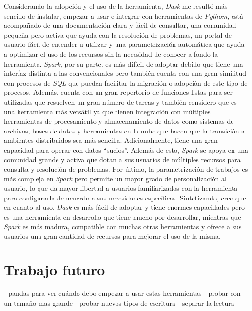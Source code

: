 Considerando la adopción y el uso de la herramienta, \textit{Dask} me resultó más sencillo de instalar, empezar a usar e integrar con herramientas de \textit{Pythom}, está acompañado de una documentación clara y fácil de consultar, una comunidad pequeña pero activa que ayuda con la resolución de problemas, un portal de usuario fácil de entender u utilizar y una parametrización automática que ayuda a optimizar el uso de los recursos sin la necesidad de conocer a fondo la herramienta. \textit{Spark}, por su parte, es más difícil de adoptar debido que tiene una interfaz distinta a las convencionales pero también cuenta con una gran similitud con procesos de \textit{SQL} que pueden facilitar la migración o adopción de este tipo de procesos. Además, cuenta con un gran repertorio de funciones listas para ser utilizadas que resuelven un gran número de tareas y también considero que es una herramienta más versátil ya que tienen integración con múltiples herramientas de procesamiento y almacenamiento de datos como sistemas de archivos, bases de datos y herramientas en la nube que hacen que la transición a ambientes distribuidos sea más sencilla. Adicionalmente, tiene una gran capacidad para operar con datos ``sucios''. Además de esto, \textit{Spark} se apoya en una comunidad grande y activa que dotan a sus usuarios de múltiples recursos para consulta y resolución de problemas. Por último, la parametrización de trabajos es más compleja en \textit{Spark} pero permite un mayor grado de personalización al usuario, lo que da mayor libertad a usuarios familiarizados con la herramienta para configurarla de acuerdo a sus necesidades específicas. Sintetizando, creo que en cuanto al uso, \textit{Dask} es más fácil de adoptar y tiene enormes capacidades pero es una herramienta en desarrollo que tiene mucho por desarrollar, mientras que \textit{Spark} es más madura, compatible con muchas otras herramientas y ofrece a sus usuarios una gran cantidad de recursos para mejorar el uso de la misma.
 


\section{Trabajo futuro}

- pandas para ver cuándo debo empezar a usar estas herramientas
- probar con un tamaño mas grande
- probar nuevos tipos de escritura
- separar la lectura